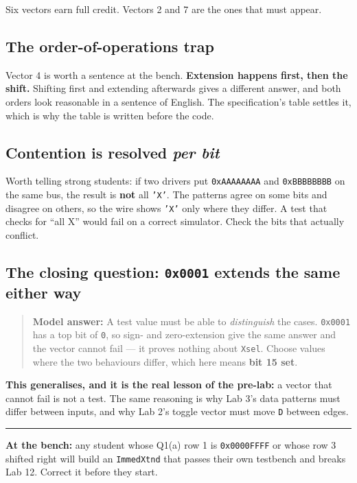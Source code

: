 \documentclass[11pt]{article}
\newcommand{\code}[1]{\texttt{#1}}
\newcommand{\hr}{\vspace{2pt}\hrule\vspace{6pt}}
\begin{document}
Six vectors earn full credit. Vectors 2 and 7 are the ones that must appear.

\subsection*{The order-of-operations trap}

Vector 4 is worth a sentence at the bench. \textbf{Extension happens first, then
the shift.} Shifting first and extending afterwards gives a different answer, and
both orders look reasonable in a sentence of English. The specification's table
settles it, which is why the table is written before the code.

\subsection*{Contention is resolved \emph{per bit}}

Worth telling strong students: if two drivers put \code{0xAAAAAAAA} and
\code{0xBBBBBBBB} on the same bus, the result is \textbf{not} all \code{'X'}. The
patterns agree on some bits and disagree on others, so the wire shows \code{'X'}
only where they differ. A test that checks for ``all X'' would fail on a correct
simulator. Check the bits that actually conflict.

\subsection*{The closing question: \code{0x0001} extends the same either way}

\begin{quote}
\textbf{Model answer:} A test value must be able to \emph{distinguish} the cases.
\code{0x0001} has a top bit of \code{0}, so sign- and zero-extension give the same
answer and the vector cannot fail --- it proves nothing about \code{Xsel}. Choose
values where the two behaviours differ, which here means \textbf{bit 15 set}.
\end{quote}

\textbf{This generalises, and it is the real lesson of the pre-lab:} a vector that
cannot fail is not a test. The same reasoning is why Lab 3's data patterns must
differ between inputs, and why Lab 2's toggle vector must move \code{D} between
edges.

\vspace{6pt}
\hr
{\small \textbf{At the bench:} any student whose Q1(a) row 1 is \code{0x0000FFFF}
or whose row 3 shifted right will build an \code{ImmedXtnd} that passes their own
testbench and breaks Lab 12. Correct it before they start.}
\end{document}
